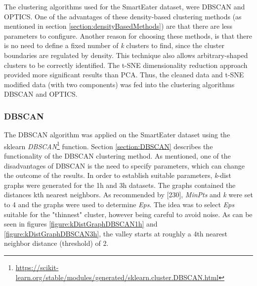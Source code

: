 The clustering algorithms used for the SmartEater dataset, were DBSCAN and OPTICS. One of the advantages of these density-based clustering methods (as mentioned in section \ref{section:densityBasedMethods}) are that there are less parameters to configure. Another reason for choosing these methods, is that there is no need to define a fixed number of \textit{k} clusters to find, since the cluster boundaries are regulated by density. This technique also allows arbitrary-shaped clusters to be correctly identified. The t-SNE dimensionality reduction approach provided more significant results than PCA. Thus, the cleaned data and t-SNE modified data (with two components) was fed into the clustering algorithms DBSCAN and OPTICS.

\subsubsection{DBSCAN}
The DBSCAN algorithm was applied on the SmartEater dataset using the sklearn \textit{DBSCAN}\footnote{\url{https://scikit-learn.org/stable/modules/generated/sklearn.cluster.DBSCAN.html}} function.
Section \ref{section:DBSCAN} describes the functionality of the DBSCAN clustering method. As mentioned, one of the disadvantages of DBSCAN is the need to specify parameters, which can change the outcome of the results. In order to establish suitable parameters, \textit{k}-dist graphs were generated for the 1h and 3h datasets. The graphs contained the distances kth nearest neighbors. As recommended by \textcite{DBSCAN}[230], \textit{MinPts} and \textit{k} were set to 4 and the graphs were used to determine \textit{Eps}. The idea was to select \textit{Eps} suitable for the "thinnest" cluster, however being careful to avoid noise. As can be seen in figures \ref{figure:kDistGraphDBSCAN1h} and \ref{figure:kDistGraphDBSCAN3h}, the valley starts at roughly a 4th nearest neighbor distance (threshold) of 2. 


